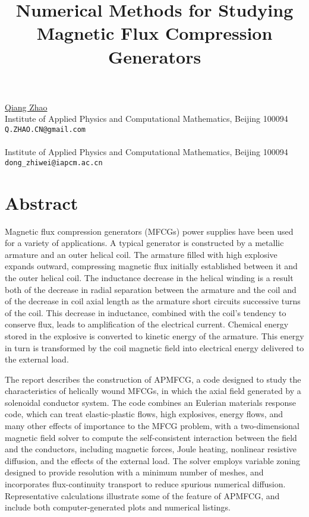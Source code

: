 \title{Numerical Methods for Studying Magnetic Flux Compression Generators}
 \author{} \institute{}
\maketitle
\begin{center}
{\large \underline{Qiang Zhao}}\\
Institute of Applied Physics and Computational Mathematics, Beijing 100094\\
{\tt Q.ZHAO.CN@gmail.com}
\\ \vspace{4mm}{\large Zhiwei Dong}\\
Institute of Applied Physics and Computational Mathematics, Beijing 100094\\
{\tt dong\_zhiwei@iapcm.ac.cn}

\end{center}

\section*{Abstract}

Magnetic flux compression generators (MFCGs) power supplies have been used for a variety of applications\cite{ref001}. A typical generator is constructed by a metallic armature and an outer helical coil. The armature filled with high explosive expands outward, compressing magnetic flux initially established between it and the outer helical coil. The inductance decrease in the helical winding is a result both of the decrease in radial separation between the armature and the coil and of the decrease in coil axial length as the armature short circuits successive turns of the coil. This decrease in inductance, combined with the coil's tendency to conserve flux, leads to amplification of the electrical current. Chemical energy stored in the explosive is converted to kinetic energy of the armature. This energy in turn is transformed by the coil magnetic field into electrical energy delivered to the external load\cite{ref002,ref003,ref004}. 

The report describes the construction of APMFCG, a code designed to study the characteristics of helically wound MFCGs, in which the axial field generated by a solenoidal conductor system. The code combines an Eulerian materials response code, which can treat elastic-plastic flows, high explosives, energy flows, and many other effects of importance to the MFCG problem,  with a two-dimensional magnetic field solver to compute the self-consistent interaction between the field and the conductors, including magnetic forces, Joule heating, nonlinear resistive diffusion, and the effects of the external load. The solver employs variable zoning designed to provide resolution with a minimum number of meshes, and incorporates flux-continuity transport to reduce spurious numerical diffusion\cite{ref005,ref006}. Representative calculations illustrate some of the feature of APMFCG, and include both computer-generated plots and numerical listings.

